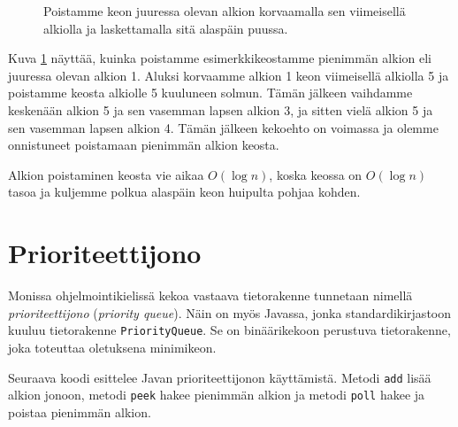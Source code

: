 \begin{figure}
\caption{Poistamme keon juuressa olevan alkion korvaamalla sen viimeisellä alkiolla
ja laskettamalla sitä alaspäin puussa.}
\label{fig:kekpoi}
\end{figure}

Kuva \ref{fig:kekpoi} näyttää, kuinka poistamme
esimerkkikeostamme pienimmän alkion eli juuressa
olevan alkion 1.
Aluksi korvaamme alkion 1
keon viimeisellä alkiolla 5 ja poistamme keosta
alkiolle 5 kuuluneen solmun.
Tämän jälkeen vaihdamme keskenään alkion 5
ja sen vasemman lapsen alkion 3,
ja sitten vielä alkion 5 ja sen vasemman lapsen alkion 4.
Tämän jälkeen kekoehto on voimassa ja olemme onnistuneet
poistamaan pienimmän alkion keosta.

Alkion poistaminen keosta vie aikaa $O(\log n)$,
koska keossa on $O(\log n)$ tasoa ja kuljemme polkua
alaspäin keon huipulta pohjaa kohden.

\section{Prioriteettijono}


Monissa ohjelmointikielissä kekoa vastaava tietorakenne
tunnetaan nimellä \emph{prioriteettijono} (\emph{priority queue}).
Näin on myös Javassa, jonka standardikirjastoon 
kuuluu tietorakenne \texttt{PriorityQueue}.
Se on binäärikekoon perustuva tietorakenne,
joka toteuttaa oletuksena minimikeon.

Seuraava koodi esittelee Javan prioriteettijonon käyttämistä.
Metodi \texttt{add} lisää alkion jonoon,
metodi \texttt{peek} hakee pienimmän alkion
ja metodi \texttt{poll} hakee ja poistaa pienimmän alkion.

